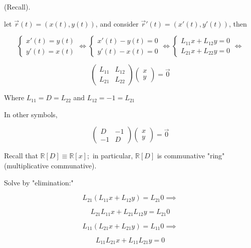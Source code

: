 
\begin{example}
  (Recall). 

  let \( \vec{r}(t) = (x(t), y(t))\), and consider \( \vec{r}'(t) =
  (x'(t), y'(t)) \), then 

  \[
  \begin{cases}
    x'(t) = y(t) \\
    y'(t) = x(t)
  \end{cases}
  \iff
  \begin{cases}
    x'(t) - y(t) =0 \\
    y'(t) - x(t) =0
  \end{cases}
  \iff
  \begin{cases}
    L_{11}x + L_{12}y = 0 \\
    L_{21}x + L_{22}y = 0
  \end{cases}
  \iff
  \]

  \[
  \begin{pmatrix}
    L_{11} & L_{12} \\
    L_{21} & L_{22}
  \end{pmatrix}
  \begin{pmatrix}
    x \\
    y
  \end{pmatrix}
  = 
  \vec{0}
  \]

  Where \( L_{11} = D = L_{22} \) and \( L_{12} = -1 = L_{21} \) 

  In other symbols, 

  \[ 
  \begin{pmatrix}
    D & -1 \\
    -1 & D
  \end{pmatrix}
  \begin{pmatrix}
    x \\
    y
  \end{pmatrix}
  = 
  \vec{0}
  \]

  Recall that \( \mathbb{R}[D] \equiv \mathbb{R}[x]; \) in particular,
  \( \mathbb{R}[D] \) is communative "ring" (multiplicative
  communative).

  Solve by "elimination:"

  \[ L_{21}(L_{11}x + L_{12}y) = L_{21}0 \implies \]

  \[ L_{21}L_{11}x + L_{21}L_{12}y = L_{21}0 \]

  \[ L_{11}(L_{21}x + L_{21}y) = L_{11}0 \implies  \]

  \[ L_{11}L_{21}x + L_{11}L_{21}y = 0 \]


\end{example}
